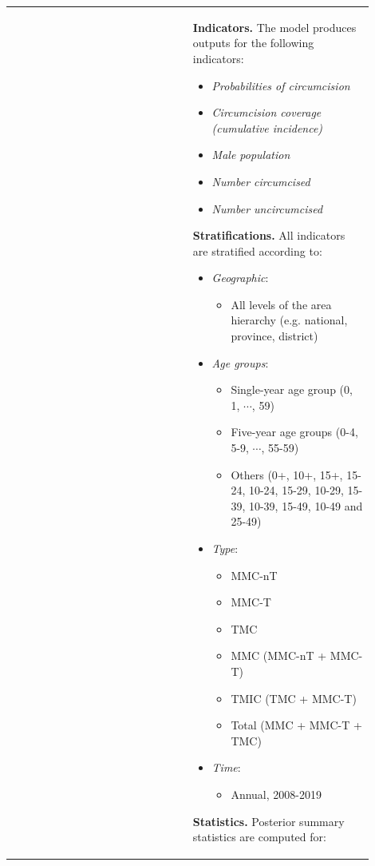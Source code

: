 \documentclass{article}
\begin{document}
\begin{appendix}
{\begin{table}[H]
\begin{tabular}{| p{0.45\linewidth} | p{0.45\linewidth} |}
		& 
			{\bf Indicators.} The model produces outputs for the following indicators: 
			\begin{itemize}
				\item {\it Probabilities of circumcision}
				\item {\it Circumcision coverage (cumulative incidence)}
				\item {\it Male population}
				\item {\it Number circumcised}
				\item {\it Number uncircumcised}
			\end{itemize}
			\vspace{5pt}
			{\bf Stratifications.} All indicators are stratified according to: 
			\begin{itemize}
				\item {\it Geographic}: 
				\begin{itemize}
					\item All levels of the area hierarchy (e.g. national, province, district)
				\end{itemize}
				\item {\it Age groups}: 
				\begin{itemize}
					\item Single-year age group (0, 1, $\cdots$, 59)
					\item Five-year age groups (0-4, 5-9, $\cdots$, 55-59)
					\item Others (0+, 10+, 15+, 15-24, 10-24, 15-29, 10-29, 15-39, 10-39, 15-49, 10-49 and 25-49)
				\end{itemize}
				\item {\it Type}: 
				\begin{itemize}
					\item MMC-nT
					\item MMC-T
					\item TMC
					\item MMC (MMC-nT + MMC-T)
					\item TMIC (TMC + MMC-T)
					\item Total (MMC + MMC-T + TMC)
				\end{itemize}
				\item {\it Time}: 
				\begin{itemize}
					\item Annual, 2008-2019
				\end{itemize}
			\end{itemize}
			\vspace{5pt}
			{\bf Statistics.} Posterior summary statistics are computed for:

\end{tabular}
\end{table}}
\end{appendix}
\end{document}
